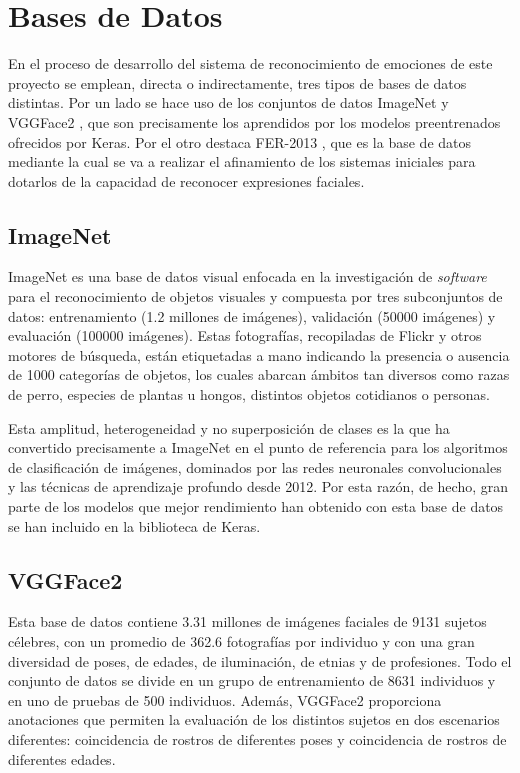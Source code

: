 \section{Bases de Datos}

En el proceso de desarrollo del sistema de reconocimiento de emociones de este proyecto se emplean, directa o indirectamente, tres tipos de bases de datos distintas. Por un lado se hace uso de los conjuntos de datos ImageNet \cite{ImageNet} y VGGFace2 \cite{VGGFace2}, que son precisamente los aprendidos por los modelos preentrenados ofrecidos por Keras. Por el otro destaca FER-2013 \cite{FER-2013}, que es la base de datos mediante la cual se va a realizar el afinamiento de los sistemas iniciales para dotarlos de la capacidad de reconocer expresiones faciales.

\subsection{ImageNet}

ImageNet es una base de datos visual enfocada en la investigación de \textit{software} para el reconocimiento de objetos visuales y compuesta por tres subconjuntos de datos: entrenamiento (1.2 millones de imágenes), validación (50000 imágenes) y evaluación (100000 imágenes). Estas fotografías, recopiladas de Flickr y otros motores de búsqueda, están etiquetadas a mano indicando la presencia o ausencia de 1000 categorías de objetos, los cuales abarcan ámbitos tan diversos como razas de perro, especies de plantas u hongos, distintos objetos cotidianos o personas.

Esta amplitud, heterogeneidad y no superposición de clases es la que ha convertido precisamente a ImageNet en el punto de referencia para los algoritmos de clasificación de imágenes, dominados por las redes neuronales convolucionales y las técnicas de aprendizaje profundo desde 2012. Por esta razón, de hecho, gran parte de los modelos que mejor rendimiento han obtenido con esta base de datos se han incluido en la biblioteca de Keras.

\subsection{VGGFace2}

Esta base de datos contiene 3.31 millones de imágenes faciales de 9131 sujetos célebres, con un promedio de 362.6 fotografías por individuo y con una gran diversidad de poses, de edades, de iluminación, de etnias y de profesiones. Todo el conjunto de datos se divide en un grupo de entrenamiento de 8631 individuos y en uno de pruebas de 500 individuos. Además, VGGFace2 proporciona anotaciones que permiten la evaluación de los distintos sujetos en dos escenarios diferentes: coincidencia de rostros de diferentes poses y coincidencia de rostros de diferentes edades.


